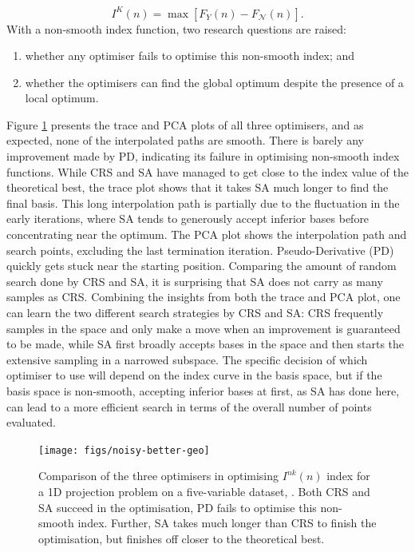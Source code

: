 \[I^{K}(n) = \max \left[F_{Y}(n) - F_{\mathcal{N}}(n)\right].\] With a non-smooth index function, two research questions are raised:

\begin{enumerate}
\def\labelenumi{\arabic{enumi})}
\tightlist
\item
  whether any optimiser fails to optimise this non-smooth index; and
\item
  whether the optimisers can find the global optimum despite the presence of a local optimum.
\end{enumerate}

Figure \ref{fig:noisy-better-geo} presents the trace and PCA plots of all three optimisers, and as expected, none of the interpolated paths are smooth. There is barely any improvement made by PD, indicating its failure in optimising non-smooth index functions. While CRS and SA have managed to get close to the index value of the theoretical best, the trace plot shows that it takes SA much longer to find the final basis. This long interpolation path is partially due to the fluctuation in the early iterations, where SA tends to generously accept inferior bases before concentrating near the optimum. The PCA plot shows the interpolation path and search points, excluding the last termination iteration. Pseudo-Derivative (PD) quickly gets stuck near the starting position. Comparing the amount of random search done by CRS and SA, it is surprising that SA does not carry as many samples as CRS. Combining the insights from both the trace and PCA plot, one can learn the two different search strategies by CRS and SA: CRS frequently samples in the space and only make a move when an improvement is guaranteed to be made, while SA first broadly accepts bases in the space and then starts the extensive sampling in a narrowed subspace. The specific decision of which optimiser to use will depend on the index curve in the basis space, but if the basis space is non-smooth, accepting inferior bases at first, as SA has done here, can lead to a more efficient search in terms of the overall number of points evaluated.

\begin{figure}

{\centering \texttt{[image: figs/noisy-better-geo]} 

}

\caption{Comparison of the three optimisers in optimising $I^{nk}(n)$ index for a 1D projection problem on a five-variable dataset, . Both CRS and SA succeed in the optimisation, PD fails to optimise this non-smooth index. Further, SA takes  much longer than CRS to finish the optimisation, but finishes off closer to the theoretical best.}\label{fig:noisy-better-geo}
\end{figure}

